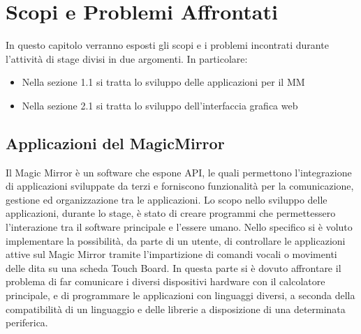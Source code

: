 \chapter{Scopi e Problemi Affrontati}
In questo capitolo verranno esposti gli scopi e i problemi incontrati durante l'attività di stage divisi in due argomenti.
In particolare:
\begin{itemize}
\item Nella sezione 1.1 si tratta lo sviluppo delle applicazioni per il MM
\item Nella sezione 2.1 si tratta lo sviluppo dell'interfaccia grafica web
\end{itemize}
\section{Applicazioni del MagicMirror}
Il Magic Mirror \`e un software che espone API, le quali permettono
l'integrazione di applicazioni sviluppate da terzi e forniscono funzionalità per la comunicazione, gestione
ed organizzazione tra le applicazioni.
Lo scopo nello sviluppo delle applicazioni, durante lo stage, \`e stato
di creare programmi che permettessero l'interazione tra il software principale
e l'essere umano. Nello specifico si \`e voluto implementare la possibilit\`a, da parte di un utente,
di controllare le applicazioni attive sul Magic Mirror tramite l'impartizione di comandi vocali
o movimenti delle dita su una scheda Touch Board.
In questa parte si \`e dovuto affrontare il problema di far comunicare
i diversi dispositivi hardware con il calcolatore principale, e di programmare
le applicazioni con linguaggi diversi, a seconda della compatibilit\`a di un linguaggio
e delle librerie a disposizione di una determinata periferica.
\\[2\baselineskip]
